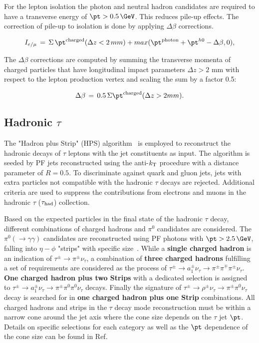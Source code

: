 For the lepton isolation the photon and neutral hadron candidates are required to have a transverse energy of $\pt>0.5\,\GeV$. This reduces pile-up effects. The correction of pile-up to isolation is done by applying $\Delta\beta$ corrections.
\begin{linenomath}
\begin{equation}
\label{eq:muonisolation1}
I_{e/ \mu}\,=\,\Sigma\, \pt^{\rm charged }(\Delta z <2\,mm)+max(\pt^{\rm photon}+\pt^{h0 }-\Delta \beta,0),
\end{equation}
\end{linenomath}
The $\Delta\beta$ corrections are computed by summing the transverse momenta of charged particles
that have longitudinal impact parameters $\Delta z > 2$ mm with respect to the lepton production
vertex and scaling the sum by a factor 0.5:
\begin{linenomath}
\begin{equation}
\label{eq:muonisolation2}
\Delta\beta\,=\,0.5\, \Sigma \pt^{\rm charged }(\Delta z > 2mm).
\end{equation}
\end{linenomath}

\subsection{\texorpdfstring{Hadronic $\tau$}{Hadronic tau}} 
\label{sec:hadTau}
The "Hadron plus Strip" (HPS) algorithm~\cite{2012JInst...7.1001C} is employed to reconstruct the hadronic decays of $\tau$ leptons with the jet constituents as input. The algorithm is seeded by PF jets reconstructed using the anti-$k_{\rm T}$ procedure with a distance parameter of $R=0.5$. To discriminate against quark and gluon jets, jets with extra particles not compatible with the hadronic $\tau$ decays are rejected. Additional criteria are used to suppress the contributions from electrons and muons in the hadronic $\tau$ ($\tau_{\rm had}$) collection.

Based on the expected particles in the final state of the hadronic $\tau$ decay, different combinations of charged hadrons and $\pi^0$ candidates are considered. The $\pi^0 (\to\gamma\gamma)$ candidates are reconstructed using PF photons with $\pt>2.5\,\GeV$, falling into $\eta-\phi$ "strips" with specific size~\cite{CMS_AN_2013-171}. While a \textbf{single charged hadron} is an indication of $\tau^{\pm}\to\pi^{\pm}\nu_{\tau}$, a combination of \textbf{three charged hadrons} fulfilling a set of requirements are considered as the process of $\tau^{\pm}\to a_1^{\pm}\nu_{\tau}\to\pi^{\pm}\pi^{\mp}\pi^{\pm}\nu_{\tau}$. \textbf{One charged hadron plus two Strips} with a dedicated selection is assigned to $\tau^{\pm}\to a_1^{\pm}\nu_{\tau}\to\pi^{\pm}\pi^{0}\pi^{0}\nu_{\tau}$ decays. Finally the signature of  $\tau^{\pm}\to\rho^{\pm}\nu_{\tau}\to\pi^{\pm}\pi^{0}\nu_{\tau}$ decay is searched for in \textbf{one charged hadron plus one Strip} combinations. All charged hadrons and strips in the $\tau$ decay mode reconstruction must be within a narrow cone around the jet axis where the cone size depends on the $\tau$ jet $\pt$. Details on specific selections for each category as well as the $\pt$ dependence of the cone size can be found in Ref.~\cite{CMS_AN_2013-171}

